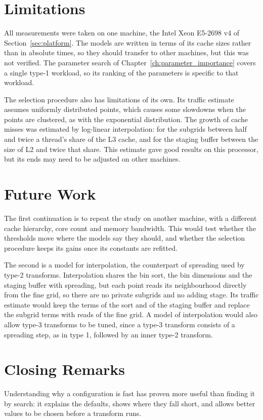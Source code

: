 \section{Limitations}
\label{sec:limitations}

All measurements were taken on one machine, the Intel Xeon E5-2698 v4 of
Section~\ref{sec:platform}. The models are written in terms of its cache sizes
rather than in absolute times, so they should transfer to other machines, but
this was not verified. The parameter search of
Chapter~\ref{ch:parameter_importance} covers a single type-1 workload, so its ranking
of the parameters is specific to that workload. 

The selection procedure also has limitations of its own. Its traffic estimate
assumes uniformly distributed points, which causes some slowdowns when the
points are clustered, as with the exponential distribution. The growth of cache
misses was estimated by log-linear interpolation: for the subgrids between half
and twice a thread's share of the L3 cache, and for the staging buffer between
the size of L2 and twice that share. This estimate gave good results on this processor,
but its ends may need to be adjusted on other machines.

\section{Future Work}
\label{sec:future_work}

The first continuation is to repeat the study on another machine, with a
different cache hierarchy, core count and memory bandwidth. This would test
whether the thresholds move where the models say they should, and whether the
selection procedure keeps its gains once its constants are refitted.

The second is a model for interpolation, the counterpart of spreading used by
type-2 transforms. Interpolation shares the bin sort, the bin dimensions and the
staging buffer with spreading, but each point reads its neighbourhood directly
from the fine grid, so there are no private subgrids and no adding stage. Its
traffic estimate would keep the terms of the sort and of the staging buffer and
replace the subgrid terms with reads of the fine grid. A model of interpolation
would also allow type-3 transforms to be tuned, since a type-3 transform consists
of a spreading step, as in type 1, followed by an inner type-2 transform.

\section{Closing Remarks}

Understanding why a configuration is fast has proven more useful than finding
it by search: it explains the defaults, shows where they fall short, and allows
better values to be chosen before a transform runs.
